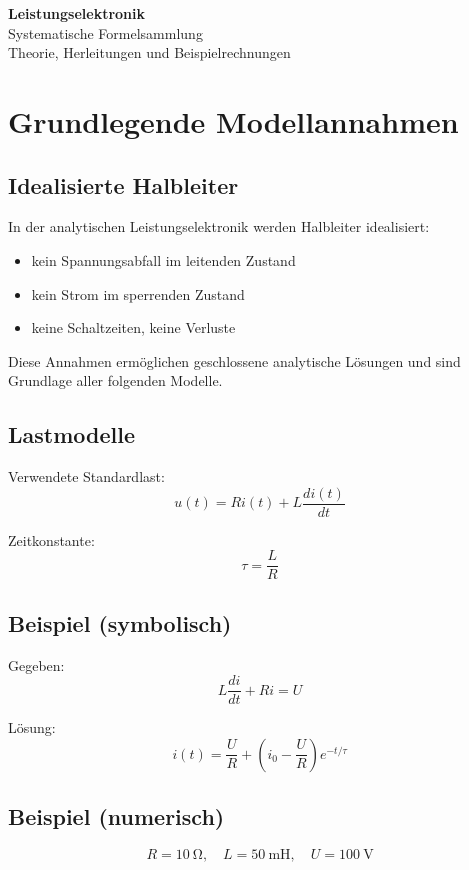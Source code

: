 \documentclass[a4paper,11pt]{article}
\begin{document}
\begin{center}
{\LARGE \textbf{Leistungselektronik}}\\
{\large Systematische Formelsammlung}\\
{\small Theorie, Herleitungen und Beispielrechnungen}
\end{center}

\tableofcontents
\newpage

\section{Grundlegende Modellannahmen}

\subsection{Idealisierte Halbleiter}
In der analytischen Leistungselektronik werden Halbleiter idealisiert:
\begin{itemize}[leftmargin=*]
  \item kein Spannungsabfall im leitenden Zustand
  \item kein Strom im sperrenden Zustand
  \item keine Schaltzeiten, keine Verluste
\end{itemize}

Diese Annahmen ermöglichen geschlossene analytische Lösungen und sind Grundlage aller folgenden Modelle.

\subsection{Lastmodelle}
Verwendete Standardlast:
\[
u(t) = R i(t) + L\frac{di(t)}{dt}
\]

Zeitkonstante:
\[
\tau = \frac{L}{R}
\]

\subsection*{Beispiel (symbolisch)}
Gegeben:
\[
L\frac{di}{dt}+Ri=U
\]

Lösung:
\[
i(t)=\frac{U}{R}+\left(i_0-\frac{U}{R}\right)e^{-t/\tau}
\]

\subsection*{Beispiel (numerisch)}
\[
R=\SI{10}{\ohm},\quad L=\SI{50}{\milli\henry},\quad U=\SI{100}{\volt}
\]
\end{document}
